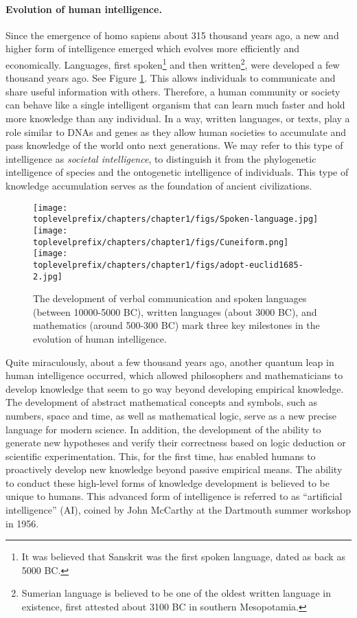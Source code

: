 \documentclass[\toplevelprefix/book-main.tex]{subfiles}
\begin{document}
\paragraph{Evolution of human intelligence.}
Since the emergence of homo sapiens about 315 thousand years ago, a new and higher form of intelligence emerged which evolves more efficiently and economically. Languages, first spoken\footnote{It was believed that Sanskrit was the first spoken language, dated as back as 5000 BC.} and then written\footnote{Sumerian language is believed to be one of the oldest written language in existence, first attested about 3100 BC in southern Mesopotamia.}, were developed a few thousand years ago. See Figure \ref{fig:human-intelligence}. This allows individuals to communicate and share useful information with others. Therefore, a human community or society can behave like a single intelligent organism that can learn much faster and hold more knowledge than any individual. In a way, written languages, or texts, play a role similar to DNAs and genes as they allow human societies to accumulate and pass knowledge of the world onto next generations. We may refer to this type of intelligence as {\em  societal intelligence}, to distinguish it from the phylogenetic intelligence of species and the ontogenetic intelligence of individuals. This type of knowledge accumulation serves as the foundation of ancient civilizations.
\begin{figure}
    \centering
    \texttt{[image: \\toplevelprefix/chapters/chapter1/figs/Spoken-language.jpg]}
   \hspace{5mm} \texttt{[image: \\toplevelprefix/chapters/chapter1/figs/Cuneiform.png]}
   \hspace{5mm} \texttt{[image: \\toplevelprefix/chapters/chapter1/figs/adopt-euclid1685-2.jpg]}
    \caption{The development of verbal communication and spoken languages (between 10000-5000 BC), written languages (about 3000 BC), and mathematics (around 500-300 BC) mark three key milestones in the evolution of human intelligence.}
    \label{fig:human-intelligence}
\end{figure}

Quite miraculously, about a few thousand years ago, another quantum leap in human intelligence occurred, which allowed philosophers and mathematicians to develop knowledge that seem to go way beyond developing empirical knowledge. The development of abstract mathematical concepts and symbols, such as numbers, space and time, as well as mathematical logic, serve as a new precise language for modern science. In addition, the development of the ability to generate new hypotheses and verify their correctness based on  logic deduction or scientific experimentation. This, for the first time, has enabled humans to proactively develop new knowledge beyond passive empirical means. The ability to conduct these high-level forms of knowledge development is believed to be unique to humans. This advanced form of intelligence is referred to as ``artificial intelligence'' (AI), coined by John McCarthy at the Dartmouth summer workshop in 1956. 
\end{document}
